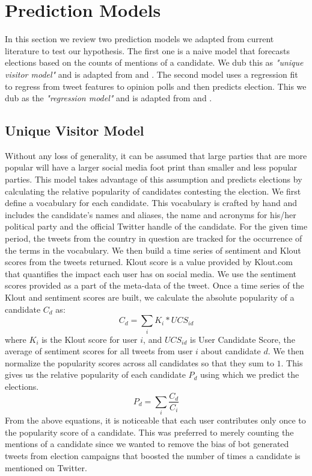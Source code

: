 \chapter{Prediction Models}

In this section we review two prediction models we adapted from current literature to test our hypothesis. 
The first one is a naive model that forecasts elections based on the counts of mentions of a candidate.
We dub this as  \emph{"unique visitor model"} and is adapted from \cite{saez2011total} and \cite{tumasjan2010predicting}.
The second model uses a regression fit to regress from tweet features to opinion polls and then predicts election. 
This we dub as the \emph{"regression model"} and is adapted from \cite{bermingham2011using} and \cite{o2010tweets}.
\section{Unique Visitor Model}
Without any loss of generality, it can be assumed that large parties that are more popular will have a larger social media foot print than smaller and less popular parties. 
This model takes advantage of this assumption and predicts elections by calculating the relative popularity of candidates contesting the election.
We first define a vocabulary for each candidate. 
This vocabulary is crafted by hand and includes the candidate's names and aliases, the name and acronyms for his/her political party and the official Twitter handle of the candidate.
For the given time period, the tweets from the country in question are tracked for the occurrence of the terms in the vocabulary.
We then build a time series of sentiment and Klout scores from the tweets returned.
Klout score is a value provided by Klout.com that quantifies the impact each user has on social media. 
We use the sentiment scores provided as a part of the meta-data of the tweet. 
Once a time series of the Klout and sentiment scores are built, we calculate the absolute popularity of a candidate $C_d$ as:
\begin{equation}
{C_d} = \sum_i K_i * UCS_{id}
\end{equation}
where $K_i$ is the Klout score for user $i$, and $UCS_{id}$ is User Candidate Score, the average of sentiment scores for all tweets from user $i$ about candidate $d$.
We then normalize the popularity scores across all candidates so that they sum to $1$.
This gives us the relative popularity of each candidate $P_d$ using which we predict the elections.
\begin{equation}
{P_d} = \sum_i \frac{C_d}{C_i}
\end{equation}
From the above equations, it is noticeable that each user contributes only once to the popularity score of a candidate.
This was preferred to merely counting the mentions of a candidate since we wanted to remove the bias of bot generated tweets from election campaigns that boosted the number of times a candidate is mentioned on Twitter.

